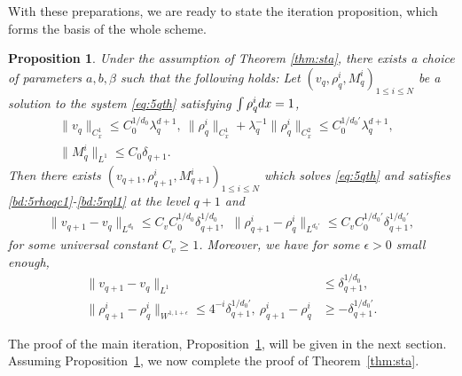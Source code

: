 \documentclass[10pt,a4paper]{amsart}
\numberwithin{equation}{section}
\newtheorem{proposition}[theorem]{Proposition}
\def\dif{{\mathord{{\rm d}}}}
\def\geq{\geqslant}
\def\leq{\leqslant}
\def\dif{{\mathord{{\rm d}}}}
\def\bp{\begin{proposition}}
\def\ep{\end{proposition}}
\def\geq{\geqslant}
\def\leq{\leqslant}
\begin{document}
     
With these preparations, we are ready to state the iteration proposition, which forms the basis of the whole scheme.

 
\bp\label{prop:sta}
Under the assumption of Theorem \ref{thm:sta}, there exists  a choice of parameters $a,b,\beta$  such
that the following holds: Let $(v_q,  \rho^i_q,  M^i_q)_{1\leq i \leq N}$ be a solution to the system \eqref{eq:5qth} satisfying  $\int  \rho^i_q\dif x=1$,
\begin{align}
\|v_q\|_ {C_{x}^1}\leq C_0^{1/d_0}\lambda_q^{ d+1},\
\|  \rho^i_{q}\|_ {C_{x}^1}+\lambda_q^{-1}\|  \rho^i_{q}\|_ {C_{x}^2}\leq C_0^{1/d_0'} \lambda_q^{ d+1},
\label{bd:5rhoqc1}\\
 \|M^i_q\|_{L^1}\leq C_0 \delta_{q+1}.&\label{bd:5rql1}
\end{align}
Then there exists 
$(v_{q+1},  \rho^i_{q+1},  M^i_{q+1})_{1\leq i \leq N}$ which solves \eqref{eq:5qth} and satisfies \eqref{bd:5rhoqc1}-\eqref{bd:5rql1} at the level $q+1$ and
\begin{align}
\|v_{q+1}-v_{q}\|_{L^{d_0}}\leq
C_vC_0^{1/d_0}\delta_{q+1}^{1/d_0},\label{bd:5vq+1-vqldd}\ \
\|  \rho^i_{q+1}-  \rho^i_{q}\|_{L^{d_0'}}\leq 
C_v C_0^{1/{d_0'}}\delta_{q+1}^{1/{d_0'}},%
\end{align}for some universal constant $C_v\geq1$. 
Moreover, we have for some $\epsilon>0$ small enough,
\begin{align}
     \|v_{q+1}-v_{q}\|_{L^{1}}&\leq \delta_{q+1}^{1/d_0},\label{bd:5vq+1-vql1}\\
 \|  \rho^i_{q+1}-  \rho^i_{q}\|_{W^{1,1+\epsilon}}\leq 
 4^{-i}\delta_{q+1}^{1/d_0'},\   \rho^i_{q+1} -   \rho^i_q&\geq - \delta_{q+1}^{1/d_0'}.\label{bd:5rhoq+1-rhoql1}
\end{align}
\ep

The proof of the main iteration, Proposition~\ref{prop:sta}, will be given in the next section. 
Assuming Proposition~\ref{prop:sta}, we now complete the proof of Theorem~\ref{thm:sta}.
 
\end{document}
